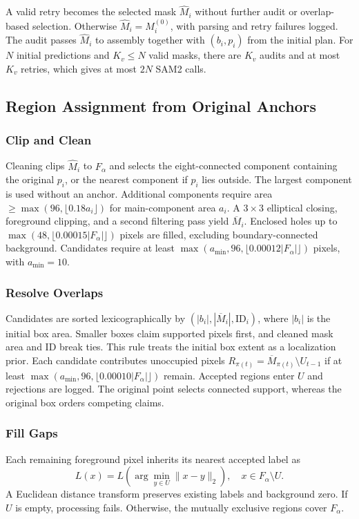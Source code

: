 \documentclass[pdflatex,sn-mathphys-ay]{sn-jnl}
\begin{document}
A valid retry becomes the selected mask $\widehat M_i$ without further audit or overlap-based selection. Otherwise $\widehat M_i=M_i^{(0)}$, with parsing and retry failures logged. The audit passes $\widehat M_i$ to assembly together with $(b_i,p_i)$ from the initial plan. For $N$ initial predictions and $K_v\leq N$ valid masks, there are $K_v$ audits and at most $K_v$ retries, which gives at most $2N$ SAM2 calls.

\subsection{Region Assignment from Original Anchors}

\subsubsection{Clip and Clean}
Cleaning clips $\widehat M_i$ to $F_\alpha$ and selects the eight-connected component containing the original $p_i$, or the nearest component if $p_i$ lies outside. The largest component is used without an anchor. Additional components require area $\geq\max(96,\lfloor0.18a_i\rfloor)$ for main-component area $a_i$. A $3\times3$ elliptical closing, foreground clipping, and a second filtering pass yield $\overline M_i$. Enclosed holes up to $\max(48,\lfloor0.00015|F_\alpha|\rfloor)$ pixels are filled, excluding boundary-connected background. Candidates require at least $\max(a_{\min},96,\lfloor0.00012|F_\alpha|\rfloor)$ pixels, with $a_{\min}=10$.

\subsubsection{Resolve Overlaps}
Candidates are sorted lexicographically by $(|b_i|,|\overline M_i|,\mathrm{ID}_i)$, where $|b_i|$ is the initial box area. Smaller boxes claim supported pixels first, and cleaned mask area and ID break ties. This rule treats the initial box extent as a localization prior. Each candidate contributes unoccupied pixels $R_{\pi(t)}=\overline M_{\pi(t)}\setminus U_{t-1}$ if at least $\max(a_{\min},96,\lfloor0.00010|F_\alpha|\rfloor)$ remain. Accepted regions enter $U$ and rejections are logged. The original point selects connected support, whereas the original box orders competing claims.

\subsubsection{Fill Gaps}
Each remaining foreground pixel inherits its nearest accepted label as
\begin{equation}
L(x)=L\!\left(\arg\min_{y\in U}\|x-y\|_2\right),
\quad x\in F_\alpha\setminus U.
\label{eq:gaps}
\end{equation}
A Euclidean distance transform preserves existing labels and background zero. If $U$ is empty, processing fails. Otherwise, the mutually exclusive regions cover $F_\alpha$.
\end{document}
